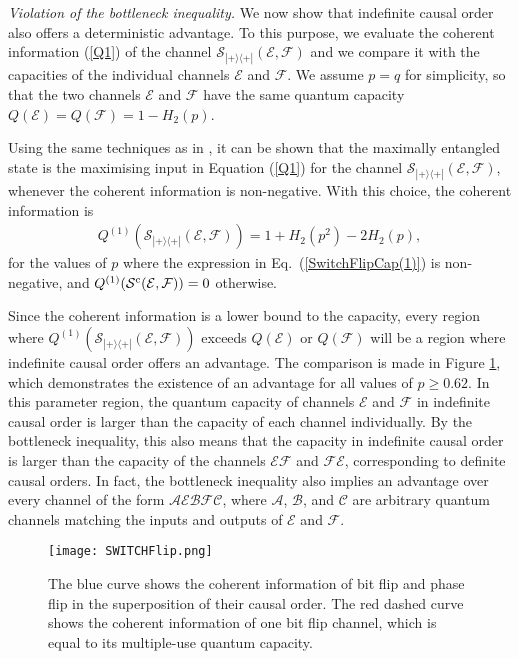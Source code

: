 \documentclass[aps,prl,twocolumn,superscriptaddress,groupedaddress]{revtex4}
\def\EQ#1{\begin{equation}\begin{aligned}#1\end{aligned}\end{equation}}
\def\>{\rangle}
\def\<{\langle}
\newcommand{\map}[1]{\mathcal{#1}}
\begin{document}
{\em Violation of the bottleneck inequality.}  We now show that indefinite causal order also  offers a deterministic advantage.  To this purpose,  we evaluate the coherent information (\ref{Q1}) of the channel   $\map S_{|+\>\<+|}(\map E, \map F)$ and we compare it with the capacities of the individual channels $\map E$ and $\map F$.  We assume $p=q$ for simplicity, so that  the two channels $\map E$ and $\map F$ have the same quantum capacity  $Q (\map E)  = Q (\map F)=  1-H_2(p)$.   

Using the same techniques as in \cite[Appendix D]{Leditzky2018}, it can be shown that the maximally entangled state is the maximising input in Equation (\ref{Q1}) for the channel $\map S_{|+\>\<+|}(\map E, \map F)$, whenever the coherent information is non-negative. With this choice, the coherent information is 
     \EQ{
Q^{(1)}(\map S_{|+\>\<+|}(\map E, \map F))=1 + H_2(p^2) - 2 H_2(p),\label{SwitchFlipCap(1)}
}
for the values of $p$ where the expression in Eq.~(\ref{SwitchFlipCap(1)}) is non-negative, and $Q^{(1)}(\map S^{\rm c}(\map E, \map F))=0$ otherwise. 

Since the coherent information is a lower bound to the capacity, every region where   $Q^{(1)}(\map S_{|+\>\<+|}(\map E, \map F))$ exceeds $Q (\map E)$ or $Q(\map F)$ will be a region where indefinite causal order offers an advantage.   The comparison is made in Figure \ref{graph}, which demonstrates the existence of an advantage  for all  values
of $p \ge 0.62$.   In this parameter region, the quantum capacity of channels $\map E$ and $\map F$ in  indefinite causal order is larger than the capacity of each channel individually. By the bottleneck inequality, this also means that the capacity in indefinite causal order is larger than the capacity of the channels $\map E \map F$ and $\map F \map E$, corresponding to definite causal orders.     In fact, the bottleneck inequality also implies an advantage over every channel of the form $\map A \map E \map B \map F \map C$, where $\map A$, $\map B$, and $\map C$ are arbitrary quantum channels matching the inputs and outputs of $\map E$ and $\map F$.  


\begin{figure}
  \centering%
      \texttt{[image: SWITCHFlip.png]}
  \caption{The blue curve shows the coherent information of bit flip and phase flip in the superposition of their causal order. The red dashed curve shows the coherent information of one bit flip channel, which is equal
  to its multiple-use quantum capacity.}
    \label{graph}
\end{figure}
\end{document}
